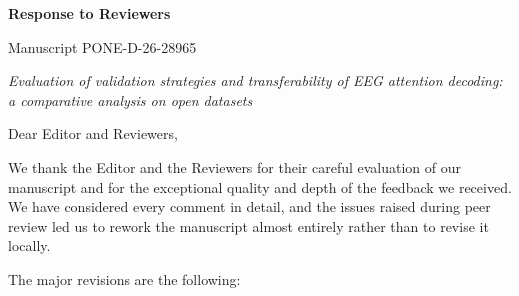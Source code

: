 \documentclass{article}
\begin{document}
%
%


\begin{center}
{\Large\bfseries Response to Reviewers}

\vspace{0.2cm}
Manuscript PONE-D-26-28965

\vspace{0.1cm}
\textit{Evaluation of validation strategies and transferability of EEG attention
decoding: a comparative analysis on open datasets}
\end{center}

\vspace{0.3cm}

\noindent
Dear Editor and Reviewers,

\vspace{0.2cm}
\noindent
We thank the Editor and the Reviewers for their careful evaluation of our
manuscript and for the exceptional quality and depth of the feedback we
received. We have considered every comment in detail, and the issues raised
during peer review led us to rework the manuscript almost entirely rather than
to revise it locally.

\vspace{0.2cm}
\noindent
The major revisions are the following:
\end{document}

